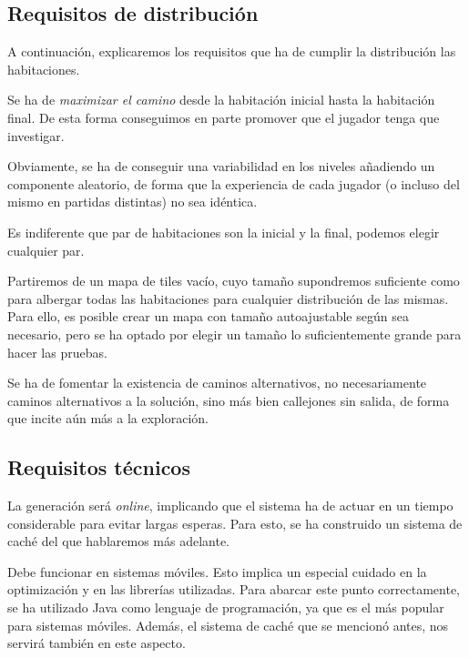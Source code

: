 \subsection{Requisitos de distribución}

A continuación, explicaremos los requisitos que ha de cumplir la distribución las habitaciones.

Se ha de \emph{maximizar el camino} desde la habitación inicial hasta la habitación final. De esta forma conseguimos en parte promover que el jugador tenga que investigar.

Obviamente, se ha de conseguir una variabilidad en los niveles añadiendo un componente aleatorio, de forma que la experiencia de cada jugador (o incluso del mismo en partidas distintas) no sea idéntica.

Es indiferente que par de habitaciones son la inicial y la final, podemos elegir cualquier par.

Partiremos de un mapa de tiles vacío, cuyo tamaño supondremos suficiente como para albergar todas las habitaciones para cualquier distribución de las mismas. Para ello, es posible crear un mapa con tamaño autoajustable según sea necesario, pero se ha optado por elegir un tamaño lo suficientemente grande para hacer las pruebas.

Se ha de fomentar la existencia de caminos alternativos, no necesariamente caminos alternativos a la solución, sino más bien callejones sin salida, de forma que incite aún más a la exploración.

\subsection{Requisitos técnicos}

La generación será \emph{online}, implicando que el sistema ha de actuar en un tiempo considerable para evitar largas esperas. Para esto, se ha construido un sistema de caché del que hablaremos más adelante.

Debe funcionar en sistemas móviles. Esto implica un especial cuidado en la optimización y en las librerías utilizadas. Para abarcar este punto correctamente, se ha utilizado Java como lenguaje de programación, ya que es el más popular para sistemas móviles. Además, el sistema de caché que se mencionó antes, nos servirá también en este aspecto.




